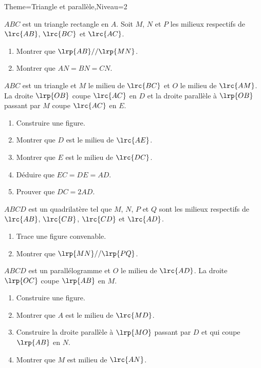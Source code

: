 \documentclass[a4paper,12pt]{article}
\begin{document}
\begin{Maquette}[Fiche]{Theme=Triangle et parallèle,Niveau=2}
\begin{exercice}
$ABC$ est un triangle rectangle en $A$. Soit $M$, $N$ et $P$ les milieux respectifs de $\lrc{AB}$,  $\lrc{BC}$ et  $\lrc{AC}$.
\begin{enumerate}
\item Montrer que $\lrp{AB}//\lrp{MN}$.
\item Montrer que $AN=BN=CN$.
\end{enumerate}
\end{exercice}

\begin{exercice}
$ABC$ est un triangle et $M$ le milieu de $\lrc{BC}$ et $O$ le milieu de $\lrc{AM}$. La droite $\lrp{OB}$ coupe $\lrc{AC}$ en $D$ et la droite parallèle à $\lrp{OB}$ passant par $M$ coupe $\lrc{AC}$ en $E$.
\begin{enumerate}
\item Construire une figure.
\item Montrer que $D$ est le milieu de $\lrc{AE}$.
\item Montrer que $E$ est le milieu de $\lrc{DC}$.
\item Déduire que $EC=DE=AD$.
\item Prouver que $DC=2AD$.
\end{enumerate}
\end{exercice}

\begin{exercice}
$ABCD$ est un quadrilatère tel que $M$, $N$, $P$ et $Q$ sont les milieux respectifs de $\lrc{AB}$, $\lrc{CB}$, $\lrc{CD}$ et $\lrc{AD}$.
\begin{enumerate}
\item Trace une figure convenable.
\item Montrer que $\lrp{MN}//\lrp{PQ}$.
\end{enumerate}
\end{exercice}

\begin{exercice}
$ABCD$ est un parallélogramme et $O$ le milieu de $\lrc{AD}$.
La droite $\lrp{OC}$ coupe $\lrp{AB}$ en $M$.
\begin{enumerate}
\item Construire une figure.
\item Montrer que $A$ est le milieu de $\lrc{MD}$.
\item Construire la droite parallèle à $\lrp{MO}$ passant par $D$ et qui coupe $\lrp{AB}$ en $N$.
\item Montrer que $M$ est milieu de $\lrc{AN}$.
\end{enumerate}
\end{exercice}


\end{Maquette}
\end{document}
